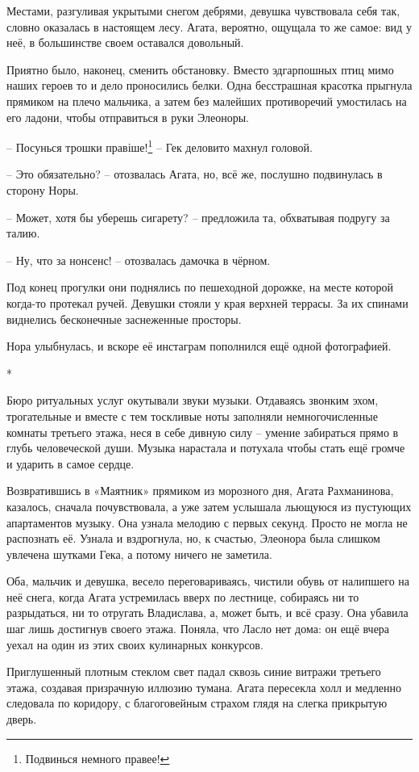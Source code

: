 \documentclass[
  a5paperpaper,
  DIV=11,
  numbers=noendperiod]{scrreprt}
\begin{document}
Местами, разгуливая укрытыми снегом дебрями, девушка чувствовала себя
так, словно оказалась в настоящем лесу. Агата, вероятно, ощущала то же
самое: вид у неё, в большинстве своем оставался довольный.

Приятно было, наконец, сменить обстановку. Вместо эдгарпошных птиц мимо
наших героев то и дело проносились белки. Одна бесстрашная красотка
прыгнула прямиком на плечо мальчика, а затем без малейших противоречий
умостилась на его ладони, чтобы отправиться в руки Элеоноры.

-- Посунься трошки правіше!\footnote{Подвинься немного правее!} -- Гек
деловито махнул головой.

-- Это обязательно? -- отозвалась Агата, но, всё же, послушно
подвинулась в сторону Норы.

-- Может, хотя бы уберешь сигарету? -- предложила та, обхватывая подругу
за талию.

-- Ну, что за нонсенс! -- отозвалась дамочка в чёрном.

Под конец прогулки они поднялись по пешеходной дорожке, на месте которой
когда-то протекал ручей. Девушки стояли у края верхней террасы. За их
спинами виднелись бесконечные заснеженные просторы.

Нора улыбнулась, и вскоре её инстаграм пополнился ещё одной фотографией.

*

Бюро ритуальных услуг окутывали звуки музыки. Отдаваясь звонким эхом,
трогательные и вместе с тем тоскливые ноты заполняли немногочисленные
комнаты третьего этажа, неся в себе дивную силу -- умение забираться
прямо в глубь человеческой души. Музыка нарастала и потухала чтобы стать
ещё громче и ударить в самое сердце.

Возвратившись в «Маятник» прямиком из морозного дня, Агата Рахманинова,
казалось, сначала почувствовала, а уже затем услышала льющуюся из
пустующих апартаментов музыку. Она узнала мелодию с первых секунд.
Просто не могла не распознать её. Узнала и вздрогнула, но, к счастью,
Элеонора была слишком увлечена шутками Гека, а потому ничего не
заметила.

Оба, мальчик и девушка, весело переговариваясь, чистили обувь от
налипшего на неё снега, когда Агата устремилась вверх по лестнице,
собираясь ни то разрыдаться, ни то отругать Владислава, а, может быть, и
всё сразу. Она убавила шаг лишь достигнув своего этажа. Поняла, что
Ласло нет дома: он ещё вчера уехал на один из этих своих кулинарных
конкурсов.

Приглушенный плотным стеклом свет падал сквозь синие витражи третьего
этажа, создавая призрачную иллюзию тумана. Агата пересекла холл и
медленно следовала по коридору, с благоговейным страхом глядя на слегка
прикрытую дверь.
\end{document}
